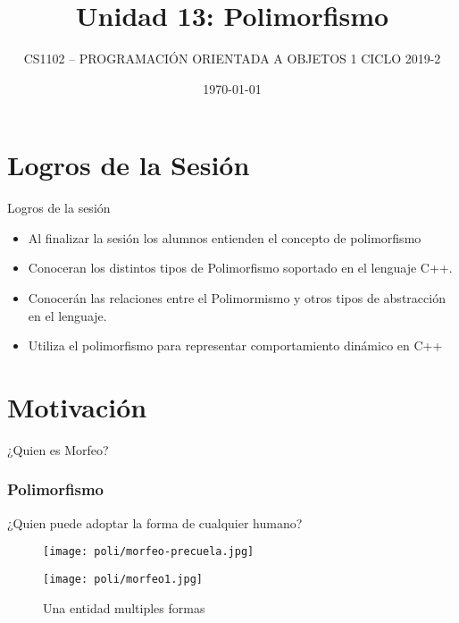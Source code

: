 \documentclass{beamer}
\title{Unidad 13: Polimorfismo}
\date[today]{\today}
\author[Name]{CS1102 – PROGRAMACIÓN ORIENTADA A OBJETOS 1 
CICLO 2019-2}
\institute[Department]{UTEC}
\begin{document}
\begin{frame}
\titlepage
\end{frame}


\section{Logros de la Sesión}

\begin{frame}[fragile]{Logros de la sesión}
    \begin{itemize}[<+- | alert@+>]
        \item Al finalizar la sesión los alumnos entienden el concepto de polimorfismo
        \item Conoceran los distintos tipos de Polimorfismo soportado en el lenguaje C++.
        \item Conocerán las relaciones entre el Polimormismo y otros tipos de abstracción en el lenguaje.
        \item Utiliza el polimorfismo para representar comportamiento dinámico en C++
    \end{itemize}
\end{frame}


\section{Motivación}


\begin{frame}[fragile]{¿Quien es Morfeo?}
\frametitle{Polimorfismo}
\begin{itemize}
  ¿Quien puede adoptar la forma de cualquier humano?
\end{itemize}

\begin{figure}
\centering
\begin{minipage}{.45\textwidth}
\centering
\texttt{[image: poli/morfeo-precuela.jpg]}
\caption{Morfeo de Matrix}
\end{minipage}
\begin{minipage}{.45\textwidth}
\centering
\texttt{[image: poli/morfeo1.jpg]}
\caption{Dios griego Morfeo}
\end{minipage}
\caption{Una entidad multiples formas}
\end{figure}
\end{frame}
\end{document}
